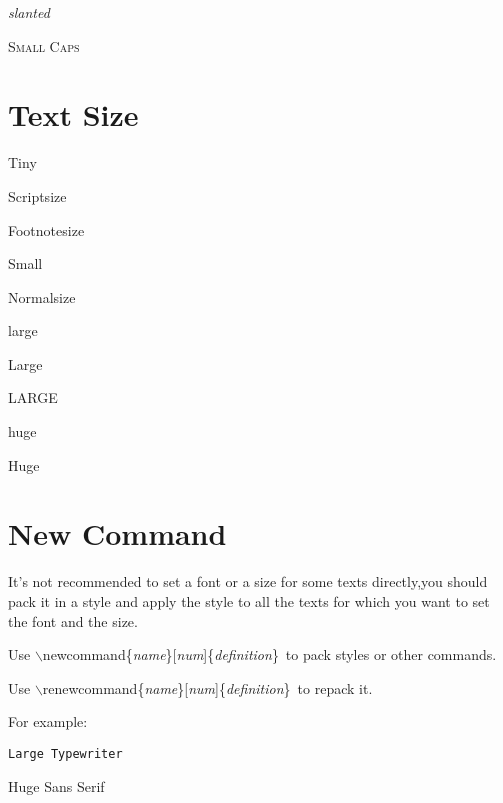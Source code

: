 \textsl{slanted}

\textsc{Small Caps}

\section{Text Size}

\tiny{Tiny}

\scriptsize{Scriptsize}

\footnotesize{Footnotesize}

\small{Small}

\normalsize{Normalsize}

\large{large}

\Large{Large}

\LARGE{LARGE}

\huge{huge}

\Huge{Huge}

\normalsize{} %

\section{New Command}

It's not recommended to set a font or a size for some texts
directly,you should pack it in a style and apply the style to all
the texts for which you want to set the font and the size.

Use
$\backslash$newcommand\{\emph{name}\}[\emph{num}]\{\emph{definition}\}\
to pack styles or other commands.

Use
$\backslash$renewcommand\{\emph{name}\}[\emph{num}]\{\emph{definition}\}\
to repack it.

For example:

\newcommand{\Ltt}[1]{\Large{\texttt{#1}}}

\Ltt{Large Typewriter}

\renewcommand{\Ltt}[1]{\Huge{\textsf{#1}}}

\Ltt{Huge Sans Serif}

\normalsize{}

